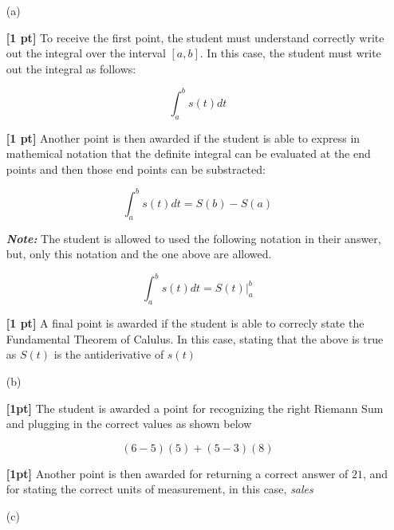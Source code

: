 \documentclass{article}
\newcommand{\qspace}{\vspace*{1.7em}}
\begin{document}
    \begin{enumerate}

		\item[(a)]
		
            \textbf{[1 pt]} To receive the first point, the student must understand correctly write out the integral over the interval
                            $[a, b]$. In this case, the student must write out the integral as follows:

                            \[
                                \int_a^b s(t)dt    
                            \]

            \textbf{[1 pt]} Another point is then awarded if the student is able to express in mathemical notation that the definite integral
                            can be evaluated at the end points and then those end points can be substracted:

                            \[
                                \int_a^b s(t)dt = S(b) - S(a)
                            \]

            \textbf{\textit{Note: }}The student is allowed to used the following notation in their answer, but, only this notation  
                                    and the one above are allowed.

                                    \[
                                        \int_a^b s(t)dt = S(t) |_{a}^{b}
                                    \]


		
            \textbf{[1 pt]} A final point is awarded if the student is able to correcly state the Fundamental Theorem of Calulus. In this case, 
                            stating that the above is true as $S(t)$ is the antiderivative of $s(t)$ \qspace 

		\item[(b)]
		
                \textbf{[1pt]} The student is awarded a point for recognizing the right Riemann Sum and plugging in the correct values
                as shown below

                \[
                        (6-5)(5) + (5-3)(8)
                \]

                \textbf{[1pt]} Another point is then awarded for returning a correct answer of $21$, and for stating the 
                correct units of measurement, in this case, \textit{sales} \qspace
		
        \item[(c)]
        

\end{enumerate}
\end{document}
